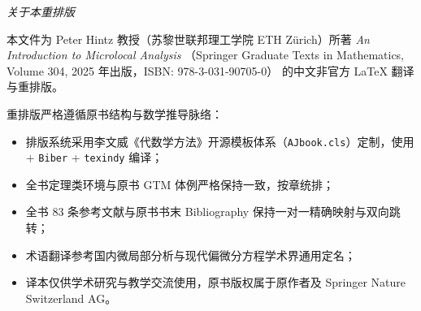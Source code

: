 \begin{titlepage}
\vfill

\end{titlepage}

\thispagestyle{empty}
\begin{center}
    \small
    \noindent\emph{关于本重排版}\\[0.6em]
    \parbox{0.86\textwidth}{
    本文件为 Peter Hintz 教授（苏黎世联邦理工学院 ETH Zürich）所著
    \emph{An Introduction to Microlocal Analysis}
    （Springer Graduate Texts in Mathematics, Volume 304, 2025 年出版，ISBN: 978-3-031-90705-0）
    的中文非官方 \LaTeX{} 翻译与重排版。
    \medskip

    重排版严格遵循原书结构与数学推导脉络：
    \begin{itemize}[leftmargin=2em, itemsep=0.2em]
      \item 排版系统采用李文威《代数学方法》开源模板体系（\texttt{AJbook.cls}）定制，使用  + \texttt{Biber} + \texttt{texindy} 编译；
      \item 全书定理类环境与原书 GTM 体例严格保持一致，按章统排；
      \item 全书 83 条参考文献与原书书末 Bibliography 保持一对一精确映射与双向跳转；
      \item 术语翻译参考国内微局部分析与现代偏微分方程学术界通用定名；
      \item 译本仅供学术研究与教学交流使用，原书版权属于原作者及 Springer Nature Switzerland AG。
    \end{itemize}
    }
\end{center}
\vfill
\clearpage
